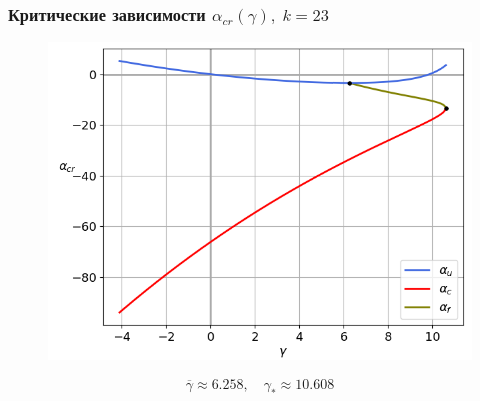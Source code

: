\documentclass[fullscreen=true, unicode, bookmarks=false]{beamer}
\begin{document}
\begin{frame}
\frametitle{ Критические зависимости $ \alpha_{cr}(\gamma), \; k = 23 $ }

\begin{figure} 
\includegraphics[scale=0.55]{alphas_045.png}  
\end{figure}
$$ \overline{\gamma} \approx 6.258, \quad \gamma_* \approx 10.608 $$

\end{frame}
\end{document}
